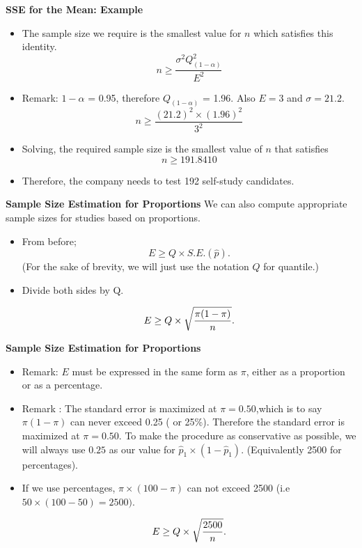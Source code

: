 \documentclass[]{report}
\begin{document}

\textbf{SSE for the Mean: Example}

\begin{itemize}
\item  The sample size we require is the smallest value for $n$ which satisfies this identity.
\[ n \geq \frac{\sigma^2 Q^2_{(1-\alpha)}}{E^2}  \]
\item  Remark: $1-\alpha$ = 0.95, therefore $Q_{(1-\alpha)}$ = 1.96. Also $E=3$ and $\sigma =21.2$.
\[ n \geq \frac{(21.2)^2 \times (1.96)^2}{3^2} \]
\item  Solving, the required sample size is the smallest value of $n$ that satisfies
\[ n \geq 191.8410 \]
\item  Therefore, the company needs to test 192 self-study candidates.
\end{itemize}



\textbf{Sample Size Estimation for Proportions}
We can also compute appropriate sample sizes for studies based on proportions.
\begin{itemize}
\item  From before; \[ E \geq Q \times S.E.(\hat{p}). \]
(For the sake of brevity, we will just use the notation $Q$ for quantile.)

\item  Divide both sides by Q.

\[ E \geq Q \times \sqrt{ {\pi(1-\pi)  \over n} }. \]

\end{itemize}



\textbf{Sample Size Estimation for Proportions}
\begin{itemize}
\item  Remark: $E$ must be expressed in the same form as $\pi$, either as a proportion or as a percentage.
\item  Remark : The standard error is maximized at $\pi = 0.50$,which is to say $\pi(1-\pi)$ can never exceed 0.25 ( or 25\%). Therefore the standard error is maximized at $\pi = 0.50$. To make the procedure as conservative as possible, we will always use $0.25$ as our value for $\hat{p}_1 \times (1 - \hat{p}_1)$. (Equivalently 2500 for percentages).
\item  If we use percentages, $\pi \times (100-\pi)$ can not exceed 2500 (i.e $ 50 \times (100-50)=2500)$.

\[ E \geq Q \times \sqrt{{2500 \over n}}. \]


\end{itemize}
\end{document}
